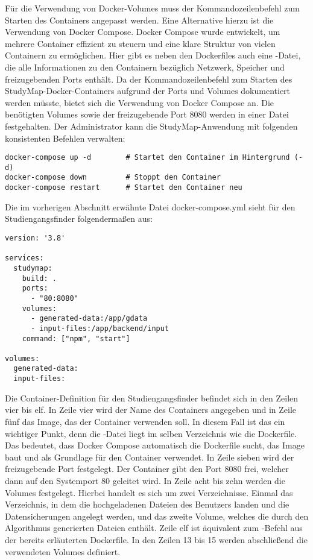 Für die Verwendung von Docker-Volumes muss der Kommandozeilenbefehl zum Starten des Containers angepasst werden. Eine Alternative hierzu ist die Verwendung von Docker Compose. Docker Compose wurde entwickelt, um mehrere Container effizient zu steuern und eine klare Struktur von vielen Containern zu ermöglichen. Hier gibt es neben den Dockerfiles auch eine -Datei, die alle Informationen zu den Containern bezüglich Netzwerk, Speicher und freizugebenden Ports enthält. Da der Kommandozeilenbefehl zum Starten des StudyMap-Docker-Containers aufgrund der Ports und Volumes dokumentiert werden müsste, bietet sich die Verwendung von Docker Compose an. Die benötigten Volumes sowie der freizugebende Port 8080 werden in einer Datei festgehalten. \parencite{docker_inc_docker_0000} Der Administrator kann die StudyMap-Anwendung mit folgenden konsistenten Befehlen verwalten:

\begin{lstlisting}[style=Python]
docker-compose up -d        # Startet den Container im Hintergrund (-d)
docker-compose down         # Stoppt den Container
docker-compose restart      # Startet den Container neu
\end{lstlisting}

Die im vorherigen Abschnitt erwähnte Datei docker-compose.yml sieht für den Studiengangsfinder folgendermaßen aus:
\begin{lstlisting}[style=Python]
version: '3.8'

services:
  studymap:
    build: .
    ports:
      - "80:8080"
    volumes:
      - generated-data:/app/gdata
      - input-files:/app/backend/input
    command: ["npm", "start"]

volumes:
  generated-data:
  input-files:
\end{lstlisting}

Die Container-Definition für den Studiengangsfinder befindet sich in den Zeilen vier bis elf. In Zeile vier wird der Name des Containers angegeben und in Zeile fünf das Image, das der Container verwenden soll. In diesem Fall ist das ein wichtiger Punkt, denn die -Datei liegt im selben Verzeichnis wie die Dockerfile. Das bedeutet, dass Docker Compose automatisch die Dockerfile sucht, das Image baut und als Grundlage für den Container verwendet. In Zeile sieben wird der freizugebende Port festgelegt. Der Container gibt den Port 8080 frei, welcher dann auf den Systemport 80 geleitet wird. In Zeile acht bis zehn werden die Volumes festgelegt. Hierbei handelt es sich um zwei Verzeichnisse. Einmal das Verzeichnis, in dem die hochgeladenen Dateien des Benutzers landen und die Datensicherungen angelegt werden, und das zweite Volume, welches die durch den Algorithmus generierten Dateien enthält. Zeile elf ist äquivalent zum -Befehl aus der bereits erläuterten Dockerfile. In den Zeilen 13 bis 15 werden abschließend die verwendeten Volumes definiert.

